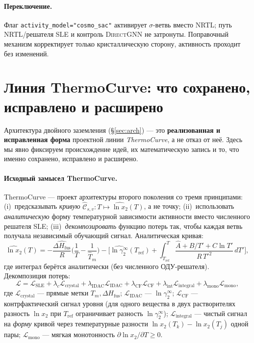 \documentclass[11pt]{article}
\theoremstyle{plain}
\theoremstyle{definition}
\newcommand{\lnx}{\ln x_2}
\newcommand{\dHfus}{\Delta H_{\mathrm{fus}}}
\newcommand{\Tm}{T_m}
\begin{document}
\paragraph{Переключение.} Флаг \texttt{activity\_model="cosmo\_sac"} активирует
$\sigma$-ветвь вместо NRTL; путь NRTL/решателя SLE и контроль \textsc{DirectGNN}
не затронуты. Поправочный механизм корректирует только кристаллическую сторону,
активность проходит без изменений.

\section{Линия ThermoCurve: что сохранено, исправлено и расширено}
\label{sec:thermocurve}
Архитектура двойного заземления (\S\ref{sec:arch}) --- это \textbf{реализованная и
исправленная форма} проектной линии \emph{ThermoCurve}, а не отказ от неё. Здесь
мы явно фиксируем происхождение идей, их математическую запись и то, что именно
сохранено, исправлено и расширено.

\paragraph{Исходный замысел ThermoCurve.} ThermoCurve --- проект архитектуры
второго поколения со тремя принципами: (i)~предсказывать \emph{кривую}
$\widehat{\mathcal C}_{s,v}\colon T\mapsto\widehat{\lnx}(T)$, а не точку;
(ii)~использовать \emph{аналитическую} форму температурной зависимости активности
вместо численного решателя SLE; (iii)~\emph{декомпозировать} функцию потерь так,
чтобы каждая ветвь получала независимый обучающий сигнал. Аналитическая кривая:
\begin{equation}
\widehat{\lnx}(T)=
-\frac{\widehat{\dHfus}}{R}\!\Big(\frac1T-\frac1{\widehat\Tm}\Big)
-\Big[\widehat{\ln\gamma_2^\infty}(T_{\text{ref}})
   +\!\int_{T_{\text{ref}}}^{T}\!\frac{\hat A+\hat B/T'+\hat C\ln T'}{R\,T'^2}\,dT'\Big],
\label{eq:thermocurve}
\end{equation}
где интеграл берётся аналитически (без численного ОДУ-решателя). Декомпозиция
потерь:
\begin{equation}
\mathcal L=\mathcal L_{\text{SLE}}
+\lambda_c\mathcal L_{\text{crystal}}
+\lambda_{\text{IDAC}}\mathcal L_{\text{IDAC}}
+\lambda_{\text{CF}}\mathcal L_{\text{CF}}
+\lambda_{\text{int}}\mathcal L_{\text{integral}}
+\lambda_{\text{mono}}\mathcal L_{\text{mono}},
\label{eq:tc-loss}
\end{equation}
где $\mathcal L_{\text{crystal}}$ --- прямые метки $\Tm,\dHfus$;
$\mathcal L_{\text{IDAC}}$ --- $\ln\gamma_2^\infty$; $\mathcal L_{\text{CF}}$ ---
контрфактический сигнал уровня (для одного вещества в двух растворителях разность
$\lnx$ при $T_{\text{ref}}$ ограничивает разность $\ln\gamma_2^\infty$);
$\mathcal L_{\text{integral}}$ --- чистый сигнал на \emph{форму} кривой через
температурные разности $\lnx(T_k)-\lnx(T_j)$ одной пары; $\mathcal L_{\text{mono}}$
--- мягкая монотонность $\partial\lnx/\partial T\ge0$.
\end{document}
